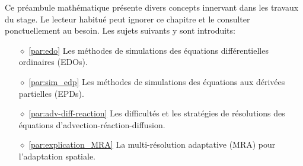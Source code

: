 Ce préambule mathématique présente divers concepts innervant dans les travaux du stage. Le lecteur habitué peut ignorer ce chapitre et 
le consulter ponctuellement au besoin. Les sujets suivants y sont introduits:
\begin{itemize}
    \item[$\diamond$] \ref{par:edo} Les méthodes de simulations des équations différentielles ordinaires (EDOs).
    \item[$\diamond$] \ref{par:sim_edp} Les méthodes de simulations des équations aux dérivées partielles (EPDs).
    \item[$\diamond$] \ref{par:adv-diff-reaction} Les difficultés et les stratégies de résolutions des équations d'advection-réaction-diffusion.
    \item[$\diamond$] \ref{par:explication_MRA} La multi-résolution adaptative (MRA) pour l'adaptation spatiale.
\end{itemize}